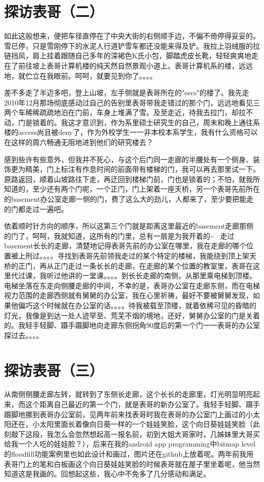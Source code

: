 \documentclass[12pt]{book}
\begin{document}
\section{探访表哥（二）}
\label{sec-37-2}
如此这般想来，便把车径直停在了中央大街的右侧顺手边，不偏不倚停得妥妥的。雪已停，只是雪刚停下的水泥人行道铲雪车都还没能来得及铲。我拉上羽绒服的拉链挡风，肩上挂着跟随自己多年的深褐色K氏小包，脚踏虎皮长靴，轻轻爽爽地走在了前往坡上表哥计算机楼的纯天然自然景观小道上。表哥计算机系的楼，远远地，就伫立在我眼前。呵呵，就要见到你了。。。。

差不多走了半迈多吧，登上山坡，左手侧就是表哥所在的"eecs"的楼了。我先走2010年12月那场彻底感动过自己的告别里表哥带我走错过的那个门，远远地看见三两个车稀稀疏疏地泊在门前，车身上堆满了雪。及至走近，待我去拉门，却拉不动，门是锁着的。我这才意识到，作为系里硕士研究生的自己，周末和晚上通往系楼的access尚且被deny了，作为外校学生一一非本校本系学生，我有什么资格可以在这样的周六畅通无阻地进到他们的研究楼去？

感到些许有些意外，但我并不死心，与这个后门同一走廊的半腰处有一个侧身、装饰更为精美，门上标注有作息时间的前面带有楼梯的门，我可以再去那里试一下。原路返回，顺着山坡路往下走，再迂回到楼梯门前，门也是锁着的；不怕，就我所知道的，至少还有两个门呢，一个正门，门上架着一座天桥，另一个表哥先前所在的basement办公室走廊一侧的门，费了这么大的劲儿，人都来了，至少要把能走的门都走过一遍吧。

依着顺时针方向的顺序，所以这第三个门就是距离这里最近的basement走廊那侧的门了，呵呵，我就知道，这所有的门里，总有一扇是为我开着的\textasciitilde{}~ 走过basement长长的走廊，清楚地记得表哥先前的办公室在哪里，我在走廊的哪个位置被上刑过。。。。寻找到表哥先前领我走过的某个特定的楼梯，我能绕到顶上架天桥的正门，再从正门走过一条长长的走廊，在走廊的某个位置的教室里，表哥在这里代过课，我听过他讲的一堂课。。。。到长长走廊的南侧，从那里乘电梯到顶楼。电梯坐落在东走向侧腰走廊的中间，不幸的是，表哥办公室在走廊东侧，而在电梯视力范围的走廊西侧就有舅舅的办公室，我在心里祈祷，最好不要被舅舅发现，如果他偏巧这个时候就在办公室的话。。。。待我被载至顶楼，就着依稀可见的昏暗的灯光，我像是到达一处人迹罕至、荒芜不烟的境地，还好，舅舅办公室的门是关着的。我轻手轻脚、蹑手蹑脚地向走廊东侧拐角90度后的第一个门一一表哥的办公室探过去。。。。
\section{探访表哥（三）}
\label{sec-37-3}
从南侧侧腰走廊左转，就转到了东侧长走廊，这个长长的走廊里，灯光明显明亮起来，而这个距离自己最近的第一个门，就是表哥的新办公室了。我轻手轻脚、蹑手蹑脚地挪到表哥办公室前，见两年前来找表哥时我在表哥的办公室门上画过的小太阳还在，小太阳里面长着像向日葵一样的一个娃娃笑脸，这个向日葵娃娃笑脸（此刻敲下这段，我怎么会忽然想起高一报名前，初到大姐大哥家时，几姊妹里大哥买给我一个人吃的娃娃脸？），后来在我的android app programming中bitmap level的floodfill功能案例里也如此设计和画过，图片还在github上放着呢。两年前我用表哥门上的笔和白板画这个向日葵娃娃笑脸的时候表哥就在屋子里坐着呢，他当然知道这是我画的。回想起这些，我心中不免多了几分感动和满足。
\end{document}
